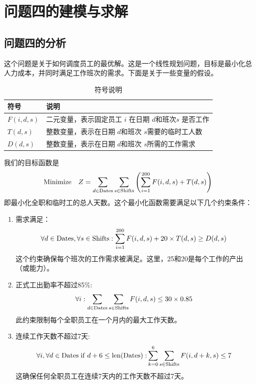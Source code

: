 \documentclass[UTF8,a4paper,10 pt]{article}%
\begin{document}
\section{问题四的建模与求解}
\subsection{问题四的分析}

这个问题是关于如何调度员工的最优解。这是一个线性规划问题，目标是最小化总人力成本，并同时满足工作班次的需求。下面是关于一些变量的假设。


\begin{table}[!ht]
\caption{符号说明}%
\centering%
\begin{tabular}{p{4cm}<{\centering}p{10cm}<{\centering}}%
\toprule%
符号&说明 \\
\midrule%
$F(i,d,s)$&二元变量，表示固定员工 $i$ 在日期 $d $和班次$ s$ 是否工作\\
$T(d,s)$&整数变量，表示在日期 $d $和班次 $s $需要的临时工人数\\
$D(d,s)$&整数变量，表示在日期 $d $和班次 $s $所需的工作需求\\
\bottomrule%
\end{tabular}
\end{table}
我们的目标函数是
\begin{align*}
    {\rm Minimize}\quad Z =\sum_{d\in {\rm Dates}}\sum_{s\in {\rm Shifts}}\left(\sum_{i = 1}^{200}F(i,d,s)+T(d,s)\right)
\end{align*}
即最小化全职和临时工的总人天数。这个最小化函数需要满足以下几个约束条件：
\begin{enumerate}
    \item 需求满足：\begin{align*}
        \forall d\in {\rm Dates},\forall s\in {\rm Shifts}:\sum_{i = 1}^{200}F(i,d,s)+20\times T(d,s)\geq D(d,s)
    \end{align*}
    这个约束确保每个班次的工作需求被满足。这里，25和20是每个工作的产出（或能力）。
    \item 正式工出勤率不超过85\%: \begin{align*}
        \forall i:\sum_{d\in {\rm Dates}}\sum_{s\in {\rm Shifts}}F(i,d,s)\leq 30 \times 0.85
    \end{align*}此约束限制每个全职员工在一个月内的最大工作天数。
    \item 连续工作天数不超过7天:\begin{align*}
        \forall i,\forall d\in {\rm Dates\; if \;} d+6 \leq{\rm len(Dates):}\sum_{k =0}^6\sum_{s\in {\rm Shifts}}   F(i,d+k,s)\leq 7
    \end{align*}这确保任何全职员工在连续7天内的工作天数不超过7天。
\end{enumerate}
\end{document}
